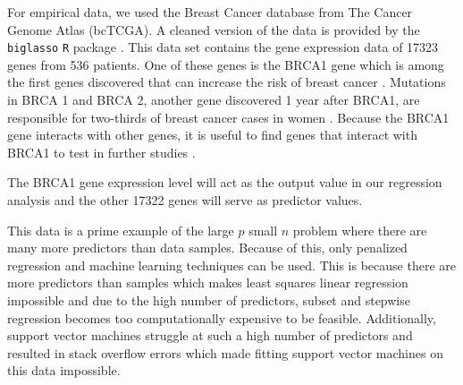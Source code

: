 \documentclass{article}
\begin{document}
	For empirical data, we used the Breast Cancer database from The Cancer Genome Atlas (bcTCGA). A cleaned version of the data is provided by the \lstinline!biglasso! \lstinline!R! package \cite{zeng2017biglasso}. This data set contains the gene expression data of 17323 genes from 536 patients. One of these genes is the BRCA1 gene which is among the first genes discovered that can increase the risk of breast cancer \cite{kuchenbaecker2017risks, antoniou2003average}. Mutations in BRCA 1 and BRCA 2, another gene discovered 1 year after BRCA1, are responsible for two-thirds of breast cancer cases in women \cite{deng2000roles}. Because the BRCA1 gene interacts with other genes, it is useful to find genes that interact with BRCA1 to test in further studies \cite{deng2000roles}. 

	The BRCA1 gene expression level will act as the output value in our regression analysis and the other 17322 genes will serve as predictor values.
	

	
	This data is a prime example of the large $p$ small $n$ problem where there are many more predictors than data samples. Because of this, only penalized regression and machine learning techniques can be used. This is because there are more predictors than samples which makes least squares linear regression impossible and due to the high number of predictors, subset and stepwise regression becomes too computationally expensive to be feasible. Additionally, support vector machines struggle at such a high number of predictors and resulted in stack overflow errors which made fitting support vector machines on this data impossible.
	
\end{document}
